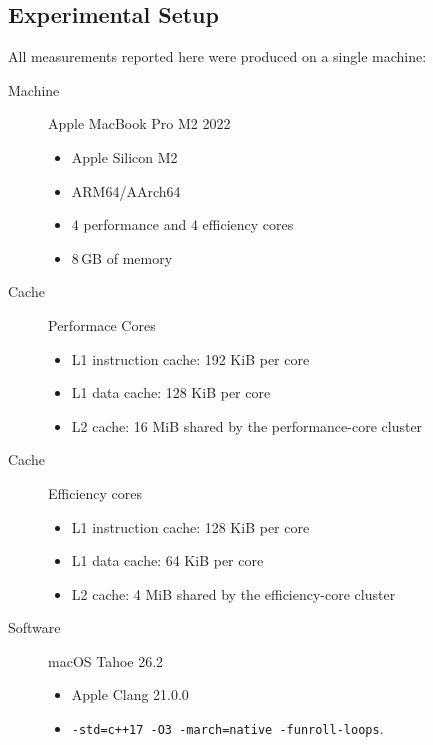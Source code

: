\documentclass[a4paper,UKenglish,cleveref,thm-restate]{lipics-v2021}
\begin{document}
\subsection{Experimental Setup}
All measurements reported here were produced on a single machine:

\begin{description}
	\item[Machine] Apple MacBook Pro M2 2022
	      \begin{itemize}
		      \item  Apple Silicon M2
		      \item ARM64/AArch64
		      \item  $4$ performance and $4$ efficiency cores
		      \item $8$\,GB of memory
	      \end{itemize}

	\item[Cache] Performace Cores
	      \begin{itemize}
		      \item  L1 instruction cache: 192 KiB per core
		      \item  L1 data cache: 128 KiB per core
		      \item   L2 cache: 16 MiB shared by the performance-core cluster
	      \end{itemize}

	\item[Cache]    Efficiency cores
	      \begin{itemize}
		      \item  L1 instruction cache: 128 KiB per core
		      \item  L1 data cache: 64 KiB per core
		      \item  L2 cache: 4 MiB shared by the efficiency-core cluster
	      \end{itemize}

	\item[Software] macOS Tahoe 26.2
	      \begin{itemize}
		      \item  Apple Clang 21.0.0
		      \item  \texttt{-std=c++17 -O3 -march=native -funroll-loops}.
	      \end{itemize}
\end{description}

\clearpage
\end{document}
